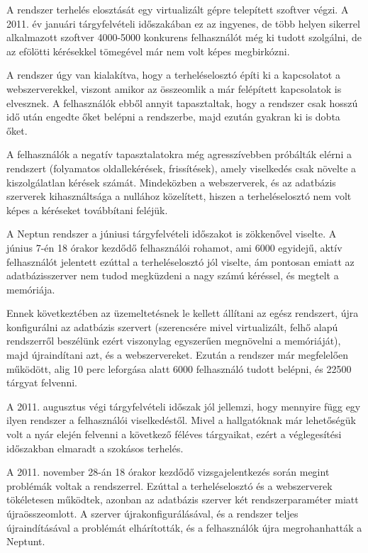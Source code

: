 A rendszer terhelés elosztását egy virtualizált gépre telepített szoftver végzi. A 2011. év januári tárgyfelvételi időszakában ez az ingyenes, de több helyen sikerrel alkalmazott szoftver 4000-5000 konkurens felhasználót még ki tudott szolgálni, de az efölötti kérésekkel tömegével már nem volt képes megbirkózni.

A rendszer úgy van kialakítva, hogy a terheléselosztó építi ki a kapcsolatot a webszerverekkel, viszont amikor az összeomlik a már felépített kapcsolatok is elvesznek. A felhasználók ebből annyit tapasztaltak, hogy a rendszer csak hosszú idő után engedte őket belépni a rendszerbe, majd ezután gyakran ki is dobta őket.

A felhasználók a negatív tapasztalatokra még agresszívebben próbálták elérni a rendszert (folyamatos oldallekérések, frissítések), amely viselkedés csak növelte a kiszolgálatlan kérések számát. Mindeközben a webszerverek, és az adatbázis szerverek kihasználtsága a nullához közelített, hiszen a terheléselosztó nem   volt képes a kéréseket továbbítani feléjük.

A Neptun rendszer a júniusi tárgyfelvételi időszakot is zökkenővel viselte. A június 7-én 18 órakor kezdődő felhasználói rohamot, ami 6000 egyidejű, aktív felhasználót jelentett ezúttal a terheléselosztó jól viselte, ám pontosan emiatt az adatbázisszerver nem tudod megküzdeni a nagy számú kéréssel, és megtelt a memóriája.

Ennek következtében az üzemeltetésnek le kellett állítani az egész rendszert, újra konfigurálni az adatbázis szervert (szerencsére mivel virtualizált, felhő alapú rendszerről beszélünk ezért viszonylag egyszerűen megnövelni a memóriáját), majd újraindítani azt, és a webszervereket. Ezután a rendszer már megfelelően működött, alig 10 perc leforgása alatt 6000 felhasználó tudott belépni, és 22500 tárgyat felvenni.

A 2011. augusztus végi tárgyfelvételi időszak jól jellemzi, hogy mennyire függ egy ilyen rendszer a felhasználói viselkedéstől.  Mivel a hallgatóknak már lehetőségük volt a nyár elején felvenni a következő féléves tárgyaikat, ezért a véglegesítési időszakban elmaradt a szokásos terhelés.

A 2011. november 28-án 18 órakor kezdődő vizsgajelentkezés során megint problémák voltak a rendszerrel. Ezúttal a terheléselosztó és a webszerverek tökéletesen működtek, azonban az adatbázis szerver két rendszerparaméter miatt újraösszeomlott. A szerver újrakonfigurálásával, és a rendszer teljes újraindításával a problémát elhárították, és a felhasználók újra megrohanhatták a Neptunt.

